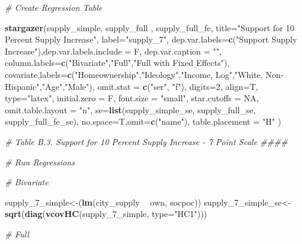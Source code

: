 \documentclass[]{article}
\newenvironment{Shaded}{\begin{snugshade}}{\end{snugshade}}
\newcommand{\CommentTok}[1]{\textcolor[rgb]{0.56,0.35,0.01}{\textit{#1}}}
\newcommand{\DataTypeTok}[1]{\textcolor[rgb]{0.13,0.29,0.53}{#1}}
\newcommand{\DecValTok}[1]{\textcolor[rgb]{0.00,0.00,0.81}{#1}}
\newcommand{\KeywordTok}[1]{\textcolor[rgb]{0.13,0.29,0.53}{\textbf{#1}}}
\newcommand{\NormalTok}[1]{#1}
\newcommand{\OperatorTok}[1]{\textcolor[rgb]{0.81,0.36,0.00}{\textbf{#1}}}
\newcommand{\OtherTok}[1]{\textcolor[rgb]{0.56,0.35,0.01}{#1}}
\newcommand{\StringTok}[1]{\textcolor[rgb]{0.31,0.60,0.02}{#1}}
\begin{document}
\begin{Shaded}
\begin{Highlighting}[]
{{{\CommentTok{# Create Regression Table}

\KeywordTok{stargazer}\NormalTok{(supply_simple,  supply_full , supply_full_fe, }\DataTypeTok{title=}\StringTok{"Support for 10 Percent Supply Increase"}\NormalTok{, }\DataTypeTok{label=}\StringTok{"supply_7"}\NormalTok{,}
          \DataTypeTok{dep.var.labels=}\KeywordTok{c}\NormalTok{(}\StringTok{"Support Supply Increase"}\NormalTok{),}\DataTypeTok{dep.var.labels.include =}\NormalTok{ F, }\DataTypeTok{dep.var.caption =} \StringTok{""}\NormalTok{,}
          \DataTypeTok{column.labels=}\KeywordTok{c}\NormalTok{(}\StringTok{"Bivariate"}\NormalTok{,}\StringTok{"Full"}\NormalTok{,}\StringTok{"Full with Fixed Effects"}\NormalTok{),}
          \DataTypeTok{covariate.labels=}\KeywordTok{c}\NormalTok{(}\StringTok{"Homeownership"}\NormalTok{,}\StringTok{"Ideology"}\NormalTok{,}\StringTok{"Income, Log"}\NormalTok{,}\StringTok{"White, Non-Hispanic"}\NormalTok{,}\StringTok{"Age"}\NormalTok{,}\StringTok{"Male"}\NormalTok{),}
          \DataTypeTok{omit.stat =} \KeywordTok{c}\NormalTok{(}\StringTok{"ser"}\NormalTok{, }\StringTok{"f"}\NormalTok{), }\DataTypeTok{digits=}\DecValTok{2}\NormalTok{, }\DataTypeTok{align=}\NormalTok{T, }\DataTypeTok{type=}\StringTok{"latex"}\NormalTok{,}
          \DataTypeTok{initial.zero =}\NormalTok{ F,  }\DataTypeTok{font.size =} \StringTok{"small"}\NormalTok{, }\DataTypeTok{star.cutoffs =} \OtherTok{NA}\NormalTok{, }\DataTypeTok{omit.table.layout =} \StringTok{"n"}\NormalTok{,}
          \DataTypeTok{se=}\KeywordTok{list}\NormalTok{(supply_simple_se, supply_full_se, supply_full_fe_se), }\DataTypeTok{no.space=}\NormalTok{T,}\DataTypeTok{omit=}\KeywordTok{c}\NormalTok{(}\StringTok{"name"}\NormalTok{), }\DataTypeTok{table.placement =} \StringTok{"H"}\NormalTok{ )}



\CommentTok{# Table B.3. Support for 10 Percent Supply Increase - 7 Point Scale ####}

\CommentTok{# Run Regressions}

\CommentTok{# Bivariate}

\NormalTok{supply_}\DecValTok{7}\NormalTok{_simple<-(}\KeywordTok{lm}\NormalTok{(city_supply }\OperatorTok{~}\StringTok{ }\NormalTok{own, socpoc))}
\NormalTok{supply_}\DecValTok{7}\NormalTok{_simple_se<-}\KeywordTok{sqrt}\NormalTok{(}\KeywordTok{diag}\NormalTok{(}\KeywordTok{vcovHC}\NormalTok{(supply_}\DecValTok{7}\NormalTok{_simple, }\DataTypeTok{type=}\StringTok{"HC1"}\NormalTok{)))}

\CommentTok{# Full}

}}}
\end{Highlighting}
\end{Shaded}
\end{document}
